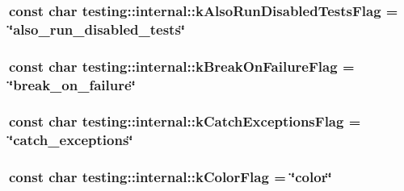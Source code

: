 \hypertarget{namespacetesting_1_1internal_a2c66dd28db3875de41836ffb69f5e38f}{
\subsubsection[{k\-Also\-Run\-Disabled\-Tests\-Flag}]{\setlength{\rightskip}{0pt plus 5cm}const char testing\-::internal\-::k\-Also\-Run\-Disabled\-Tests\-Flag = \char`\"{}also\-\_\-run\-\_\-disabled\-\_\-tests\char`\"{}}}\label{namespacetesting_1_1internal_a2c66dd28db3875de41836ffb69f5e38f}
\hypertarget{namespacetesting_1_1internal_a3ac1c81fca74b3efd59ad92b8c87607c}{
\subsubsection[{k\-Break\-On\-Failure\-Flag}]{\setlength{\rightskip}{0pt plus 5cm}const char testing\-::internal\-::k\-Break\-On\-Failure\-Flag = \char`\"{}break\-\_\-on\-\_\-failure\char`\"{}}}\label{namespacetesting_1_1internal_a3ac1c81fca74b3efd59ad92b8c87607c}
\hypertarget{namespacetesting_1_1internal_a425758b6c799546541730db3069ab6ca}{
\subsubsection[{k\-Catch\-Exceptions\-Flag}]{\setlength{\rightskip}{0pt plus 5cm}const char testing\-::internal\-::k\-Catch\-Exceptions\-Flag = \char`\"{}catch\-\_\-exceptions\char`\"{}}}\label{namespacetesting_1_1internal_a425758b6c799546541730db3069ab6ca}
\hypertarget{namespacetesting_1_1internal_abd2c557df2babd71d213882d4a9dd5c5}{
\subsubsection[{k\-Color\-Flag}]{\setlength{\rightskip}{0pt plus 5cm}const char testing\-::internal\-::k\-Color\-Flag = \char`\"{}color\char`\"{}}}\label{namespacetesting_1_1internal_abd2c557df2babd71d213882d4a9dd5c5}
